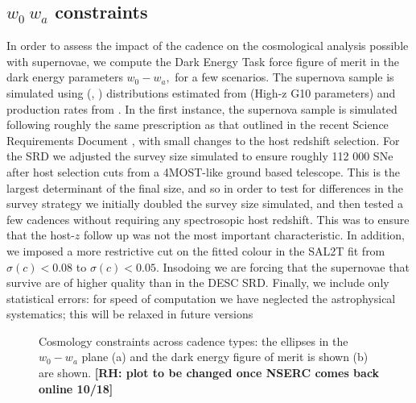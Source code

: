 \subsection{$w_0~w_a$ constraints}


In order to assess the impact of the cadence on the cosmological analysis possible with supernovae, we compute the Dark Energy Task force figure of merit \cite{2006astro.ph..9591A} in the dark energy parameters $w_0-w_a,$ for a few scenarios. The supernova sample is simulated using (\stretch, \sncolor) distributions estimated from \cite{2016ApJ...822L..35S} (High-z G10 parameters) and production rates from  \cite{2008ApJ...682..262D}. 
In the first instance, the supernova sample is simulated following roughly the same prescription as that outlined in the recent Science Requirements Document \cite{2018arXiv180901669T}, with small changes to the host redshift selection. For the SRD we adjusted the survey size simulated to ensure roughly 112 000 SNe after host selection cuts from a 4MOST-like ground based telescope. This is the largest determinant of the final size, and so in order to test for differences in the survey strategy we initially doubled the survey size simulated, and then tested a few cadences without requiring any spectrosopic host redshift. This was to ensure that the host-$z$ follow up was not the most important characteristic.
In addition, we imposed a more restrictive cut on the fitted colour in the SAL2T fit from $\sigma(c) < 0.08$ to $\sigma(c) < 0.05.$ Insodoing we are forcing that the supernovae that survive are of higher quality than in the DESC SRD.
Finally, we include only statistical errors: for speed of computation we have neglected the astrophysical systematics; this will be relaxed in future versions


\begin{figure}
  \begin{center}
    \caption{Cosmology constraints across cadence types: the ellipses in the $w_0-w_a$ plane (a) and the dark energy figure of merit is shown (b) are shown. \textbf{[RH: plot to be changed once NSERC comes back online 10/18]}}
    \end{center}
\end{figure}

